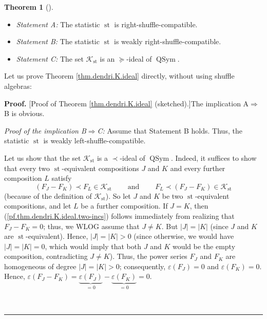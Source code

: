 \documentclass[numbers=enddot,12pt,final,onecolumn,notitlepage]{scrartcl}%
\theoremstyle{definition}
\newtheorem{theo}{Theorem}[section]
\newenvironment{theorem}[1][]
{\begin{theo}[#1]\begin{leftbar}}
{\end{leftbar}\end{theo}}
\newenvironment{proof}[1][Proof]{\noindent\textbf{#1.} }{\ \rule{0.5em}{0.5em}}
\newenvironment{verlong}{}{}
\begin{document}
\begin{verlong}
\begin{theorem}
\begin{itemize}
\item \textit{Statement A:} The statistic $\operatorname*{st}$ is right-shuffle-compatible.

\item \textit{Statement B:} The statistic $\operatorname*{st}$ is weakly right-shuffle-compatible.

\item \textit{Statement C:} The set $\mathcal{K}_{\operatorname*{st}}$ is an
$\left.  \succeq\right.  $-ideal of $\operatorname*{QSym}$.
\end{itemize}
\end{theorem}

Let us prove Theorem \ref{thm.dendri.K.ideal} directly, without using shuffle algebras:

\begin{proof}
[Proof of Theorem \ref{thm.dendri.K.ideal} (sketched).]The implication
A$\Longrightarrow$B is obvious.

\textit{Proof of the implication B}$\Longrightarrow$\textit{C:} Assume that
Statement B holds. Thus, the statistic $\operatorname*{st}$ is weakly left-shuffle-compatible.

Let us show that the set $\mathcal{K}_{\operatorname*{st}}$ is a $\left.
\prec\right.  $-ideal of $\operatorname*{QSym}$. Indeed, it suffices to show
that every two $\operatorname*{st}$-equivalent compositions $J$ and $K$ and
every further composition $L$ satisfy%
\begin{equation}
\left(  F_{J}-F_{K}\right)  \left.  \prec\right.  F_{L}\in\mathcal{K}%
_{\operatorname*{st}}\ \ \ \ \ \ \ \ \ \ \text{and}\ \ \ \ \ \ \ \ \ \ F_{L}%
\left.  \prec\right.  \left(  F_{J}-F_{K}\right)  \in\mathcal{K}%
_{\operatorname*{st}} \label{pf.thm.dendri.K.ideal.two-incs}%
\end{equation}
(because of the definition of $\mathcal{K}_{\operatorname*{st}}$). So let $J$
and $K$ be two $\operatorname*{st}$-equivalent compositions, and let $L$ be a
further composition. If $J=K$, then (\ref{pf.thm.dendri.K.ideal.two-incs})
follows immediately from realizing that $F_{J}-F_{K}=0$; thus, we WLOG assume
that $J\neq K$. But $\left\vert J\right\vert =\left\vert K\right\vert $ (since
$J$ and $K$ are $\operatorname*{st}$-equivalent). Hence, $\left\vert
J\right\vert =\left\vert K\right\vert >0$ (since otherwise, we would have
$\left\vert J\right\vert =\left\vert K\right\vert =0$, which would imply that
both $J$ and $K$ would be the empty composition, contradicting $J\neq K$).
Thus, the power series $F_{J}$ and $F_{K}$ are homogeneous of degree
$\left\vert J\right\vert =\left\vert K\right\vert >0$; consequently,
$\varepsilon\left(  F_{J}\right)  =0$ and $\varepsilon\left(  F_{K}\right)
=0$. Hence, $\varepsilon\left(  F_{J}-F_{K}\right)  =\underbrace{\varepsilon
\left(  F_{J}\right)  }_{=0}-\underbrace{\varepsilon\left(  F_{K}\right)
}_{=0}=0$.


\end{proof}
\end{verlong}
\end{document}
